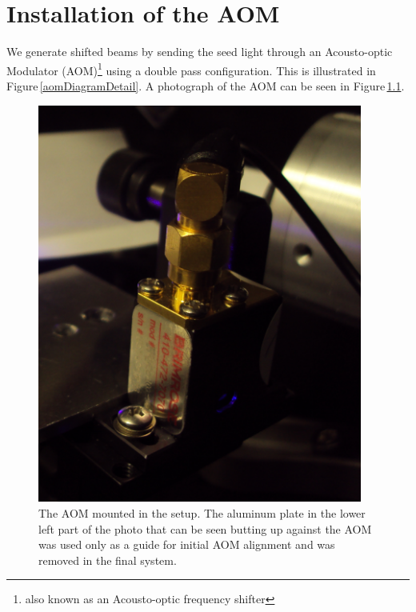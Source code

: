 \chapter{Installation of the AOM}\label{AOMInstallChapter}

We generate shifted beams by sending the seed light through an Acousto-optic Modulator (AOM)\footnote{also known as an Acousto-optic frequency shifter} using a double pass configuration. This is illustrated in Figure\,\ref{aomDiagramDetail}. A photograph of the AOM can be seen in Figure\,\ref{aom_upclose}.

\begin{figure}
\centerline{
\includegraphics[width=0.95\textwidth]{aom_upclose.JPG}}
\caption[Photograph of AOM]{\label{aom_upclose} The AOM mounted in the setup. The aluminum plate in the lower left part of the photo that can be seen butting up against the AOM was used only as a guide for initial AOM alignment and was removed in the final system.}
\end{figure}
